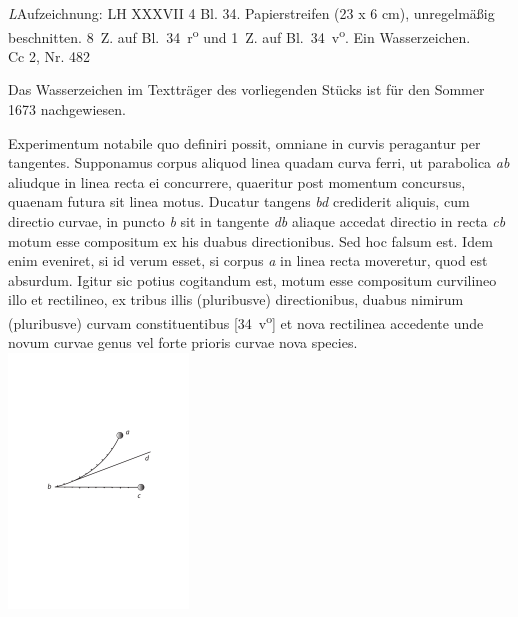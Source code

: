 \begin{Ueberlieferung}%
{\textit{L}}Aufzeichnung: LH XXXVII 4 Bl. 34. Papierstreifen (23 x 6 cm), unregelmäßig beschnitten. 8~Z. auf Bl.~34~r\textsuperscript{o} und 1~Z. auf Bl.~34~v\textsuperscript{o}. Ein Wasserzeichen.\\
Cc 2, Nr. 482
\end{Ueberlieferung}

\begin{Datierungsgruende}%
Das Wasserzeichen im Textträger des vorliegenden Stücks ist für den Sommer 1673 nachgewiesen.
 \end{Datierungsgruende}

\pstartfirst [34~r\textsuperscript{o}] Experimentum notabile quo definiri possit, omniane in curvis peragantur per tangentes. Supponamus corpus aliquod linea quadam curva ferri, ut parabolica \textit{ab} aliud\-que in linea recta ei concurrere, quaeritur post momentum concursus\protect{}, quaenam futura sit linea motus. Ducatur tangens \textit{bd} crediderit aliquis, cum directio curvae, in puncto \textit{b} sit in tangente \textit{db} aliaque accedat directio in recta \textit{cb} motum esse compositum ex his duabus directionibus. Sed hoc falsum est. Idem enim eveniret, si id verum esset,  si corpus \textit{a} in linea recta  moveretur, quod est absurdum. Igitur sic potius cogitandum est, motum esse compositum  curvilineo illo et rectilineo,  ex tribus illis (pluribusve) directionibus, duabus nimirum (pluribusve) curvam constituentibus [34~v\textsuperscript{o}] et nova rectilinea accedente unde novum curvae genus vel forte prioris curvae nova species.\pend
\vspace{2em}
\pstart
\centering
\includegraphics[trim = 0mm 0mm 0mm 0mm, clip, width=0.36\textwidth]{images/lh374_34rkonvertiert.pdf}\\
 \noindent {} 
  \pend
 

